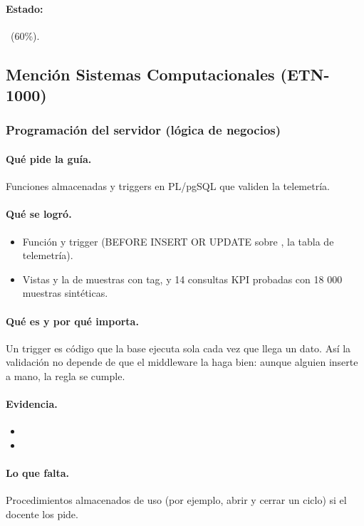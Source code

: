 \documentclass[a4paper,11pt]{article}
\begin{document}
\paragraph{Estado:} \parcial~(60\%).
\subsection{Mención Sistemas Computacionales (ETN-1000)}
\subsubsection{Programación del servidor (lógica de negocios)}
\paragraph{Qué pide la guía.} Funciones almacenadas y triggers en PL/pgSQL que validen la telemetría.
\paragraph{Qué se logró.}
\begin{itemize}
\item Función  y trigger  (BEFORE INSERT OR UPDATE sobre , la tabla de telemetría).
\item Vistas  y la de muestras con tag, y 14 consultas KPI probadas con 18 000 muestras sintéticas.
\end{itemize}
\paragraph{Qué es y por qué importa.} Un trigger es código que la base ejecuta sola cada vez que llega un dato. Así la validación no depende de que el middleware la haga bien: aunque alguien inserte a mano, la regla se cumple.
\paragraph{Evidencia.}
\begin{itemize}\small
\item {}
\item {}
\end{itemize}
\paragraph{Lo que falta.} Procedimientos almacenados de uso (por ejemplo, abrir y cerrar un ciclo) si el docente los pide.
\end{document}
